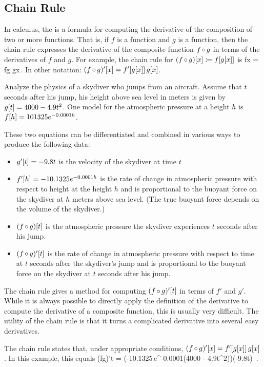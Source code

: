 \subsection{Chain Rule}
In calculus, the  is a formula for computing the derivative of the composition of two or more functions. That is, if $f$ is a function and $g$ is a function, then the chain rule expresses the derivative of the composite function $f\operatorname{\circ} g$ in terms of the derivatives of $f$ and $g$. For example, the chain rule for $(f\operatorname{\circ} g)\!\left[{x}\right]\coloneqq f\!\left[{g\!\left[{x}\right]}\right]$ is
\beq
\xod fx = \xod fg \xod gx\,.
\eeq
In other notation: $(f\operatorname{\circ} g )'\!\left[{x}\right] = f'\!\left[{g\!\left[{x}\right]}\right]g\!\left[{x}\right]$.


\begin{example}
Analyze the physics of a skydiver who jumps from an aircraft. Assume that $t$ seconds after his jump, his height above sea level in meters is given by $g\!\left[{t}\right] = 4000 - 4.9t^2$. One model for the atmospheric pressure at a height $h$ is $f\!\left[{h}\right] = 101325 e^{-0.0001h}$. 
\end{example}
These two equations can be differentiated and combined in various ways to produce the following data:
\begin{itemize}
\item $g'\!\left[{t}\right] = -9.8t$ is the velocity of the skydiver at time $t$
%
\item $f'\!\left[{h}\right] = -10.1325e^{-0.0001h}$ is the rate of change in atmospheric pressure with respect to height at the height $h$ and is proportional to the buoyant force on the skydiver at $h$ meters above sea level. (The true buoyant force depends on the volume of the skydiver.)
%
\item $(f\operatorname{\circ} g)\!\left[{t}\right]$ is the atmospheric pressure the skydiver experiences $t$ seconds after his jump.
%
\item $(f\operatorname{\circ} g)'\!\left[{t}\right]$ is the rate of change in atmospheric pressure with respect to time at $t$ seconds after the skydiver's jump and is proportional to the buoyant force on the skydiver at $t$ seconds after his jump.
\end{itemize}
The chain rule gives a method for computing $(f\operatorname{\circ} g)'\!\left[{t}\right]$ in terms of $f'$ and $g'$. While it is always possible to directly apply the definition of the derivative to compute the derivative of a composite function, this is usually very difficult. The utility of the chain rule is that it turns a complicated derivative into several easy derivatives.

The chain rule states that, under appropriate conditions, $(f\operatorname{\circ} g)'\!\left[{x}\right] = f'\!\left[{g\!\left[{x}\right]}\right]g\!\left[{x}\right]$. In this example, this equals
\beq
(f\fcomp g)'\vat t = (-10.1325\,e^{-0.0001(4000 - 4.9t^2)})(-9.8t) \,.
\eeq

